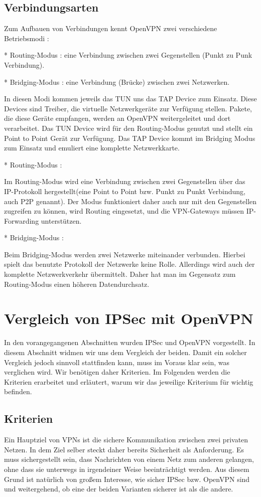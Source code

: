\documentclass[12pt]{scrartcl}
\begin{document}
\subsection{Verbindungsarten}

Zum Aufbauen von Verbindungen kennt OpenVPN zwei verschiedene Betriebsmodi :

* Routing-Modus : eine Verbindung zwischen zwei Gegenstellen (Punkt zu Punk Verbindung).

* Bridging-Modus : eine Verbindung (Brücke) zwischen zwei Netzwerken.

In diesen Modi kommen jeweils das TUN uns das TAP Device zum Einsatz. Diese Devices sind Treiber, die virtuelle Netzwerkgeräte zur Verfügung stellen. Pakete, die diese Geräte empfangen, werden an OpenVPN weitergeleitet und dort verarbeitet. Das TUN Device wird für den Routing-Modus genutzt und stellt ein Point to Point Gerät zur Verfügung. Das TAP Device kommt im Bridging Modus zum Einsatz und emuliert eine komplette Netzwerkkarte. 

* Routing-Modus :

Im Routing-Modus wird eine Verbindung zwischen zwei Gegenstellen über das IP-Protokoll hergestellt(eine Point to Point bzw. Punkt zu Punkt Verbindung, auch P2P genannt). Der  Modus funktioniert daher auch nur mit den Gegenstellen zugreifen zu können, wird Routing eingesetzt, und die VPN-Gateways müssen IP-Forwarding unterstützen.

* Bridging-Modus : 

Beim Bridging-Modus werden zwei Netzwerke miteinander verbunden. Hierbei spielt das benutzte Protokoll der Netzwerke keine Rolle. Allerdings wird auch der komplette Netzwerkverkehr übermittelt. Daher hat man im Gegensatz zum Routing-Modus einen höheren Datendurchsatz.




\section{Vergleich von IPSec mit OpenVPN}

In den vorangegangenen Abschnitten wurden IPSec und OpenVPN vorgestellt. In diesem Abschnitt widmen wir uns dem Vergleich der beiden. Damit ein solcher Vergleich jedoch sinnvoll stattfinden kann, muss im Voraus klar sein, was verglichen wird. Wir benötigen daher Kriterien. Im Folgenden werden die Kriterien erarbeitet und erläutert, warum wir das jeweilige Kriterium für wichtig befinden.

\subsection{Kriterien}
Ein Hauptziel von VPNs ist die sichere Kommunikation zwischen zwei privaten Netzen. In dem Ziel selber steckt daher bereits Sicherheit als Anforderung. Es muss sichergestellt sein, dass Nachrichten von einem Netz zum anderen gelangen, ohne dass sie unterwegs in irgendeiner Weise beeinträchtigt werden. Aus diesem Grund ist natürlich von großem Interesse, wie sicher IPSec bzw. OpenVPN sind und weitergehend, ob eine der beiden Varianten sicherer ist als die andere.
\end{document}
